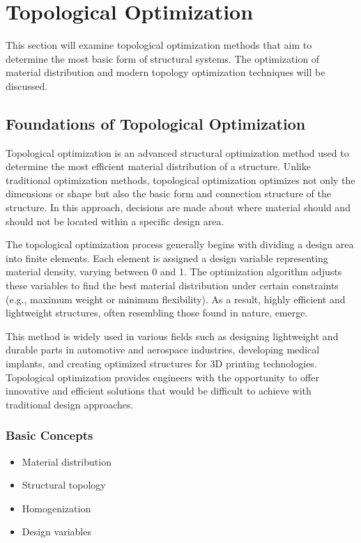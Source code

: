 \section{Topological Optimization}
This section will examine topological optimization methods that aim to determine the most basic form of structural systems. The optimization of material distribution and modern topology optimization techniques will be discussed.

\subsection{Foundations of Topological Optimization}
Topological optimization is an advanced structural optimization method used to determine the most efficient material distribution of a structure. Unlike traditional optimization methods, topological optimization optimizes not only the dimensions or shape but also the basic form and connection structure of the structure. In this approach, decisions are made about where material should and should not be located within a specific design area.

The topological optimization process generally begins with dividing a design area into finite elements. Each element is assigned a design variable representing material density, varying between 0 and 1. The optimization algorithm adjusts these variables to find the best material distribution under certain constraints (e.g., maximum weight or minimum flexibility). As a result, highly efficient and lightweight structures, often resembling those found in nature, emerge.

This method is widely used in various fields such as designing lightweight and durable parts in automotive and aerospace industries, developing medical implants, and creating optimized structures for 3D printing technologies. Topological optimization provides engineers with the opportunity to offer innovative and efficient solutions that would be difficult to achieve with traditional design approaches.

\subsubsection{Basic Concepts}
\begin{itemize}
    \item Material distribution 
    \item Structural topology 
    \item Homogenization 
    \item Design variables 
\end{itemize}

